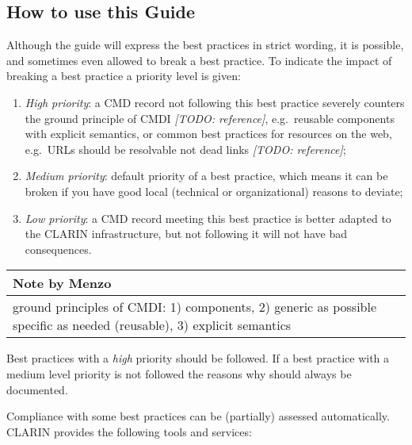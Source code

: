 \subsection{How to use this Guide}

Although the guide will express the best practices in strict wording, it
is possible, and sometimes even allowed to break a best practice. To
indicate the impact of breaking a best practice a priority level is
given:

\begin{enumerate}
\def\labelenumi{\arabic{enumi}.}
\tightlist
\item
  \emph{High priority}: a CMD record not following this best practice
  severely counters the ground principle of CMDI \emph{{[}TODO:
  reference{]}}, e.g.~reusable components with explicit semantics, or
  common best practices for resources on the web, e.g.~URLs should be
  resolvable not dead links \emph{{[}TODO: reference{]}};
\item
  \emph{Medium priority}: default priority of a best practice, which
  means it can be broken if you have good local (technical or
  organizational) reasons to deviate;
\item
  \emph{Low priority}: a CMD record meeting this best practice is better
  adapted to the CLARIN infrastructure, but not following it will not
  have bad consequences.
\end{enumerate}

\begin{longtable}[c]{@{}l@{}}
\toprule
\begin{minipage}[b]{0.07\columnwidth}\raggedright\strut
Note by Menzo
\strut\end{minipage}\tabularnewline
\midrule
\endhead
\begin{minipage}[t]{0.07\columnwidth}\raggedright\strut
ground principles of CMDI: 1) components, 2) generic as possible
specific as needed (reusable), 3) explicit semantics
\strut\end{minipage}\tabularnewline
\bottomrule
\end{longtable}

Best practices with a \emph{high} priority should be followed. If a best
practice with a medium level priority is not followed the reasons why
should always be documented.

Compliance with some best practices can be (partially) assessed
automatically. CLARIN provides the following tools and services:

